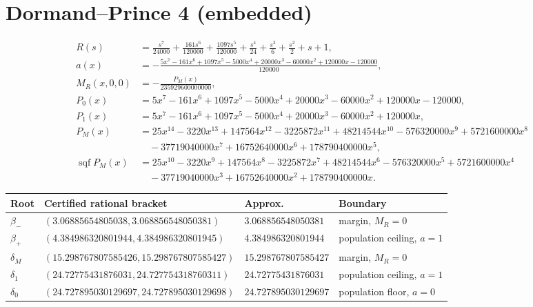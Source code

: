 \documentclass[11pt]{article}
\begin{document}
\section{Dormand--Prince 4 (embedded)}
\begin{align*}
R(s)&=\frac{s^{7}}{24000} + \frac{161 s^{6}}{120000} + \frac{1097 s^{5}}{120000} + \frac{s^{4}}{24} + \frac{s^{3}}{6} + \frac{s^{2}}{2} + s + 1,\\
a(x)&=- \frac{5 x^{7} - 161 x^{6} + 1097 x^{5} - 5000 x^{4} + 20000 x^{3} - 60000 x^{2} + 120000 x - 120000}{120000},\\
M_R(x,0,0)&=-\frac{P_M(x)}{235929600000000},\\
P_0(x)&=5 x^{7}-161 x^{6}+1097 x^{5}-5000 x^{4}+20000 x^{3}-60000 x^{2}+120000 x-120000,\\
P_1(x)&=5 x^{7}-161 x^{6}+1097 x^{5}-5000 x^{4}+20000 x^{3}-60000 x^{2}+120000 x,\\
P_M(x)&=25 x^{14}-3220 x^{13}+147564 x^{12}-3225872 x^{11}+48214544 x^{10}-576320000 x^{9}+5721600000 x^{8}\\
&\quad-37719040000 x^{7}+16752640000 x^{6}+178790400000 x^{5},\\
\operatorname{sqf}P_M(x)&=25 x^{10}-3220 x^{9}+147564 x^{8}-3225872 x^{7}+48214544 x^{6}-576320000 x^{5}+5721600000 x^{4}\\
&\quad-37719040000 x^{3}+16752640000 x^{2}+178790400000 x.
\end{align*}
\begin{center}
\begin{tabular}{@{}llll@{}}
\toprule
Root & Certified rational bracket & Approx. & Boundary \\
\midrule
$\beta_-$ & $(3.06885654805038,3.068856548050381)$ & $3.068856548050381$ & margin, $M_R=0$ \\
$\beta_+$ & $(4.384986320801944,4.384986320801945)$ & $4.384986320801944$ & population ceiling, $a=1$ \\
$\delta_M$ & $(15.298767807585426,15.298767807585427)$ & $15.298767807585427$ & margin, $M_R=0$ \\
$\delta_1$ & $(24.72775431876031,24.727754318760311)$ & $24.72775431876031$ & population ceiling, $a=1$ \\
$\delta_0$ & $(24.727895030129697,24.727895030129698)$ & $24.727895030129697$ & population floor, $a=0$ \\
\bottomrule
\end{tabular}
\end{center}
\end{document}
